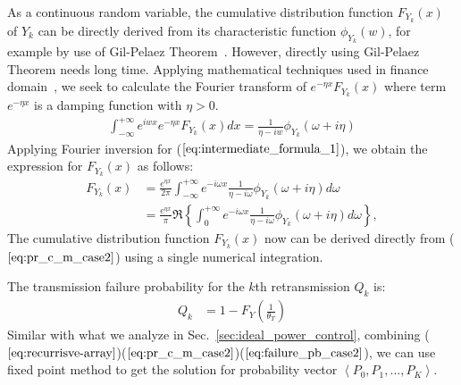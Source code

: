 As a continuous random variable, the cumulative distribution function $F_{Y_k}\left( x \right)$ of $Y_k$ can be directly derived from its characteristic function $\phi_{Y_k}\left(w\right)$, for example by use of Gil-Pelaez Theorem~\cite{gil1951note}. However, directly using Gil-Pelaez Theorem needs long time. Applying mathematical techniques used in finance domain~\cite{hirsa2012computational}, we seek to calculate the Fourier transform of $e^{-\eta x} F_{Y_k}\left( x \right)$ where term $e^{-\eta x}$ is a damping function with $\eta > 0$. 
\begin{align}
	\label{eq:intermediate_formula_1}
	\int_{-\infty}^{+\infty} e^{iwx} e^{-\eta x} F_{Y_k}\left( x \right) dx = \frac{1}{\eta - iw} \phi_{Y_{k}}\left( \omega +i\eta \right) 
\end{align}
Applying Fourier inversion for ($\ref{eq:intermediate_formula_1}$), we obtain the expression for $F_{Y_k}\left( x \right)$ as follows:
\begin{align}
\label{eq:pr_c_m_case2}
F_{Y_k}\left( x \right)  &= \frac{e^{\eta x}}{2\pi} \int_{-\infty}^{+\infty} e^{-i \omega x} \frac{1}{\eta - i\omega} \phi_{Y_k}\left( \omega +i\eta\right) d\omega  \nonumber\\
&= \frac{e^{\eta x}}{\pi} \Re\left\lbrace  \int_{0}^{+\infty} e^{-i \omega x} \frac{1}{\eta - i\omega} \phi_{Y_k}\left( \omega +i\eta\right) d\omega\right\rbrace, 
\end{align}
The cumulative distribution function $F_{Y_k}\left( x \right)$ now can be derived directly from ($\ref{eq:pr_c_m_case2}$) using a single numerical integration.

The transmission failure probability for the $k$th retransmission $Q_{k}$ is:
\begin{align}
\label{eq:failure_pb_case2}
Q_{k} &= 1- F_{Y}\left( \frac{1}{\theta_{T}} \right) 
\end{align}
Similar with what we analyze in Sec.~\ref{sec:ideal_power_control}, combining ($\ref{eq:recurrisve-array}$)($\ref{eq:pr_c_m_case2}$)($\ref{eq:failure_pb_case2}$), we can use fixed point method to get the solution for probability vector $\left\langle P_0, P_1, ..., P_K\right\rangle$.




